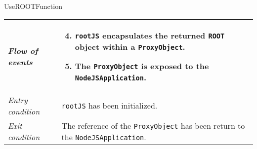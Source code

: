 \begin{frame}[t]{UseROOTFunction}
        \begin{longtable}{p{3cm} @{\hskip 1cm} p{7cm}}
                \textit{Flow of events} &
                        \begin{enumerate}
                                \setcounter{enumi}{3}
                                \pause

                                \item \texttt{rootJS} encapsulates the returned \texttt{ROOT} object within a \texttt{ProxyObject}.
                                \pause

                                \item The \texttt{ProxyObject} is exposed to the \texttt{NodeJSApplication}.
                        \end{enumerate}
                       \\
                \hline
                \pause

                \textit{Entry condition} & \texttt{rootJS} has been initialized.\\
                \hline

                \textit{Exit condition} & The reference of the \texttt{ProxyObject} has been return to the \texttt{NodeJSApplication}.\\
                \hline
        \end{longtable}
\end{frame}

